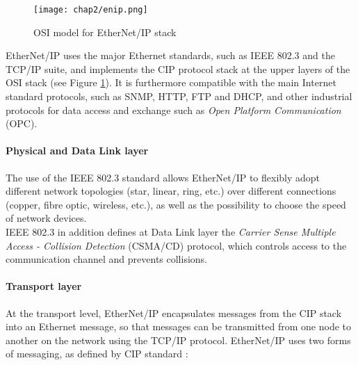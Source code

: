\begin{figure}[ht]
	\centering
	\texttt{[image: chap2/enip.png]}
	\caption{OSI model for EtherNet/IP stack}
	\label{fig:enip}
\end{figure}

EtherNet/IP uses the major Ethernet standards, such as IEEE 802.3 and the TCP/IP suite, and implements the CIP protocol stack at the upper layers of the OSI stack (see Figure \ref{fig:enip}). It is furthermore compatible with the main Internet standard protocols, such as SNMP, HTTP, FTP and DHCP, and other industrial protocols for data access and exchange such as \textit{Open Platform Communication} (OPC).

\paragraph{Physical and Data Link layer}

The use of the IEEE 802.3 standard allows EtherNet/IP to flexibly adopt different network topologies (star, linear, ring, etc.) over different connections (copper, fibre optic, wireless, etc.), as well as the possibility to choose the speed of network devices. \\
IEEE 802.3 in addition defines at Data Link layer the \textit{Carrier Sense Multiple Access - Collision Detection} (CSMA/CD) protocol, which controls access to the communication channel and prevents collisions.

\paragraph{Transport layer} 

At the transport level, EtherNet/IP encapsulates messages from the CIP stack into an Ethernet message, so that messages can be transmitted from one node to another on the network using the TCP/IP protocol. EtherNet/IP uses two forms of messaging, as
defined by CIP standard \cite{enip_pdf}\cite{enip_pdf2}:

